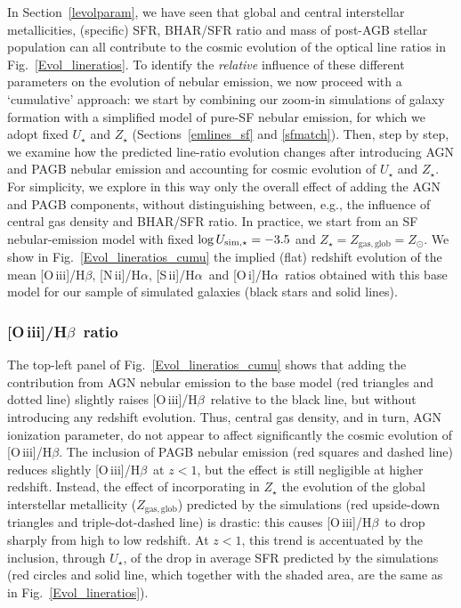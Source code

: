 \documentclass[fleqn,usenatbib]{mnras}
\newcommand{\oiiihb}{\hbox{[O\,{\sc iii}]/H$\beta$}}
\newcommand{\niiha}{\hbox{[N\,{\sc ii}]/H$\alpha$}}
\newcommand{\siiha}{\hbox{[S\,{\sc ii}]/H$\alpha$}}
\newcommand{\oiha}{\hbox{[O\,{\sc i}]/H$\alpha$}}
\begin{document}
In Section~\ref{levolparam}, we have seen that global and central
interstellar metallicities,  (specific) SFR, BHAR/SFR ratio and
mass of post-AGB stellar population can all contribute to the cosmic
evolution of the optical line ratios in Fig.~\ref{Evol_lineratios}.
To identify the {\em relative} influence of these different parameters
on the evolution of nebular emission, we now proceed with a
`cumulative' approach: we start  by combining our zoom-in simulations
of galaxy formation with a simplified model of  pure-SF nebular
emission, for which we adopt fixed $U_\star$ and $Z_\star$
(Sections~\ref{emlines_sf} and \ref{sfmatch}). Then, step by step, we
examine how the predicted line-ratio evolution changes after
introducing AGN and PAGB nebular emission and accounting for cosmic
evolution of $U_\star$ and $Z_\star$. For simplicity, we explore in
this way only the overall effect of adding the AGN and PAGB
components,  without distinguishing between, e.g., the influence of
central gas density and BHAR/SFR  ratio. In practice, we start from an
SF nebular-emission model with fixed $\log U_{\rm sim,\star}  = -3.5$
and $Z_\star=Z_\mathrm{gas,glob} =Z_\odot$. We show in
Fig.~\ref{Evol_lineratios_cumu}  the implied (flat) redshift evolution
of the mean \oiiihb, \niiha, \siiha\ and \oiha\ ratios obtained with
this base model for our sample of simulated galaxies (black stars and
solid lines). 

\subsubsection{\oiiihb\ ratio}

The top-left panel of Fig.~\ref{Evol_lineratios_cumu} shows that
adding the contribution from AGN nebular emission to the base model
(red triangles and dotted line) slightly raises \oiiihb\
relative to the black line, but without introducing any redshift
evolution. Thus, central gas density, and in turn, AGN ionization
parameter, do not appear to affect significantly the cosmic evolution
of \oiiihb. The inclusion of PAGB nebular emission (red squares and
 dashed line) reduces slightly \oiiihb\ at $z<1$, but the effect is
still negligible at higher redshift. Instead, the effect of
incorporating in $Z_\star$ the  evolution of the global interstellar
metallicity ($Z_\mathrm{gas,glob}$) predicted by the simulations  (red
upside-down triangles and triple-dot-dashed line) is drastic: this
causes \oiiihb\ to  drop sharply from high to low redshift. At $z<1$,
this trend is accentuated by the inclusion, through $U_\star$, of the
drop in average SFR predicted by the  simulations (red circles and
solid line, which together with the shaded area, are the same as in
Fig.~\ref{Evol_lineratios}). 
\end{document}
